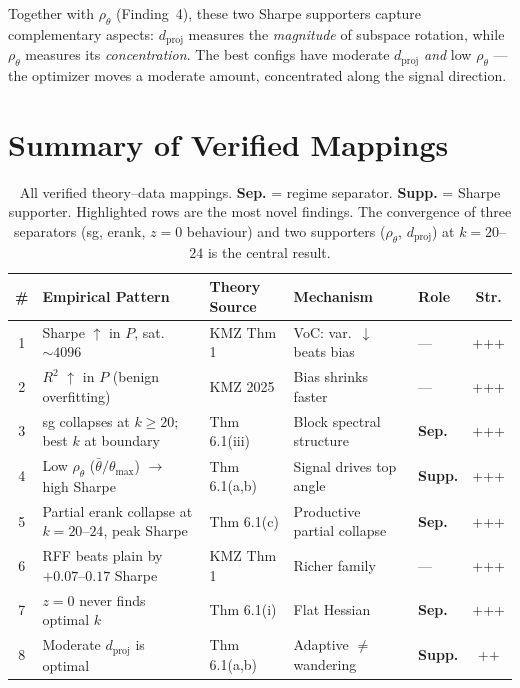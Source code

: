 \documentclass[11pt,a4paper]{article}
\begin{document}
Together with $\rho_\theta$ (Finding~4), these two Sharpe supporters capture complementary aspects: $d_{\mathrm{proj}}$ measures the \emph{magnitude} of subspace rotation, while $\rho_\theta$ measures its \emph{concentration}.  The best configs have moderate $d_{\mathrm{proj}}$ \emph{and} low $\rho_\theta$ --- the optimizer moves a moderate amount, concentrated along the signal direction.


\section{Summary of Verified Mappings}
\label{sec:summary}

\begin{table}[H]
\centering\small
\setlength{\tabcolsep}{3pt}
\begin{tabular}{cllllc}
\toprule
\# & Empirical Pattern & Theory Source & Mechanism & Role & Str. \\
\midrule
1 & Sharpe $\uparrow$ in $P$, sat.\ $\sim 4096$ & KMZ Thm 1 & VoC: var.\ $\downarrow$ beats bias & --- & +++ \\
2 & $R^2$ $\uparrow$ in $P$ (benign overfitting) & KMZ 2025 & Bias shrinks faster & --- & +++ \\
\rowcolor{boxblue}
3 & sg collapses at $k \geq 20$; best $k$ at boundary & Thm 6.1(iii) & Block spectral structure & \textbf{Sep.} & +++ \\
\rowcolor{boxblue}
4 & Low $\rho_\theta$ ($\bar\theta / \theta_{\max}$) $\to$ high Sharpe & Thm 6.1(a,b) & Signal drives top angle & \textbf{Supp.} & +++ \\
\rowcolor{boxblue}
5 & Partial erank collapse at $k = 20$--$24$, peak Sharpe & Thm 6.1(c) & Productive partial collapse & \textbf{Sep.} & +++ \\
6 & RFF beats plain by $+0.07$--$0.17$ Sharpe & KMZ Thm 1 & Richer family & --- & +++ \\
\rowcolor{boxblue}
7 & $z = 0$ never finds optimal $k$ & Thm 6.1(i) & Flat Hessian & \textbf{Sep.} & +++ \\
8 & Moderate $d_{\mathrm{proj}}$ is optimal & Thm 6.1(a,b) & Adaptive $\neq$ wandering & \textbf{Supp.} & ++ \\
\bottomrule
\end{tabular}
\caption{All verified theory--data mappings.  \textbf{Sep.} = regime separator.  \textbf{Supp.} = Sharpe supporter.  Highlighted rows are the most novel findings.  The convergence of three separators (sg, erank, $z = 0$ behaviour) and two supporters ($\rho_\theta$, $d_{\mathrm{proj}}$) at $k = 20$--$24$ is the central result.}
\label{tab:summary}
\end{table}
\end{document}
